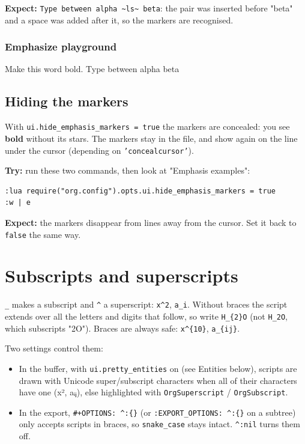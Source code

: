 \textbf{Expect:} \texttt{Type between alpha \textasciitilde{}ls\textasciitilde{} beta}: the pair was inserted before
"beta" and a space was added after it, so the markers are recognised.
\subsubsection{Emphasize playground}
\label{sec:org28d6e92}
Make this word bold.
Type between alpha beta
\subsection{Hiding the markers}
\label{sec:org8463113}
With \texttt{ui.hide\_emphasis\_markers = true} the markers are concealed: you see
\textbf{bold} without its stars. The markers stay in the file, and show again on
the line under the cursor (depending on \texttt{'concealcursor'}).

\textbf{Try:} run these two commands, then look at "Emphasis examples":

\begin{verbatim}
:lua require("org.config").opts.ui.hide_emphasis_markers = true
:w | e
\end{verbatim}

\textbf{Expect:} the markers disappear from lines away from the cursor. Set it
back to \texttt{false} the same way.
\section{Subscripts and superscripts}
\label{sec:org1183b91}
\texttt{\_} makes a subscript and \texttt{\textasciicircum{}} a superscript: \texttt{x\textasciicircum{}2}, \texttt{a\_i}. Without braces
the script extends over all the letters and digits that follow, so write
\texttt{H\_\{2\}O} (not \texttt{H\_2O}, which subscripts "2O"). Braces are always safe:
\texttt{x\textasciicircum{}\{10\}}, \texttt{a\_\{ij\}}.

Two settings control them:
\begin{itemize}
\item In the buffer, with \texttt{ui.pretty\_entities} on (see Entities below), scripts
are drawn with Unicode super/subscript characters when all of their
characters have one (x², aᵢⱼ), else highlighted with \texttt{OrgSuperscript} /
\texttt{OrgSubscript}.
\item In the export, \texttt{\#+OPTIONS: \textasciicircum{}:\{\}} (or \texttt{:EXPORT\_OPTIONS: \textasciicircum{}:\{\}} on a
subtree) only accepts scripts in braces, so \texttt{snake\_case} stays intact.
\texttt{\textasciicircum{}:nil} turns them off.
\end{itemize}

